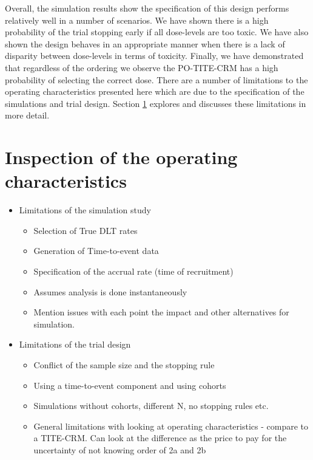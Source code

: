 Overall, the simulation results show the specification of this design performs relatively well in a number of scenarios. We have shown there is a high probability of the trial stopping early if all dose-levels are too toxic. We have also shown the design behaves in an appropriate manner when there is a lack of disparity between dose-levels in terms of toxicity. Finally, we have demonstrated that regardless of the ordering we observe the PO-TITE-CRM has a high probability of selecting the correct dose. There are a number of limitations to the operating characteristics presented here which are due to the specification of the simulations and trial design. Section \ref{section2.4} explores and discusses these limitations in more detail.


\section{Inspection of the operating characteristics}  
\label{section2.4}%


\begin{itemize}
	\item Limitations of the simulation study 
		\begin{itemize}
			\item Selection of True DLT rates 
			\item Generation of Time-to-event data
			\item Specification of the accrual rate (time of recruitment)
			\item Assumes analysis is done instantaneously 
			\item Mention issues with each point the impact and other alternatives for simulation. 
		\end{itemize}
	\item Limitations of the trial design 
		\begin{itemize}
			\item Conflict of the sample size and the stopping rule
			\item Using a time-to-event component and using cohorts 
			\item Simulations without cohorts, different N, no stopping rules etc. 
			\item General limitations with looking at operating characteristics - compare to a TITE-CRM. Can look at the difference as the price to pay for the uncertainty of not knowing order of 2a and 2b 
		\end{itemize}
\end{itemize}


